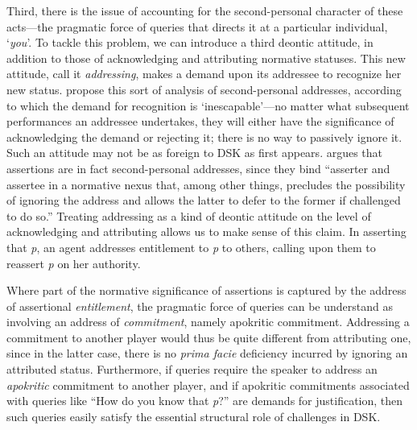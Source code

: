 \documentclass{article}                     %
\begin{document}
Third, there is the issue of accounting for the second-personal character of these acts---the pragmatic force of queries that directs it at a particular individual, `\emph{you}'. To tackle this problem, we can introduce a third deontic attitude, in addition to those of acknowledging and attributing normative statuses. This new attitude, call it \emph{addressing}, makes a demand upon its addressee to recognize her new status. \textcite{Kukla2009} propose this sort of analysis of second-personal addresses, according to which the demand for recognition is `inescapable'---no matter what subsequent performances an addressee undertakes, they will either have the significance of acknowledging the demand or rejecting it; there is no way to passively ignore it. Such an attitude may not be as foreign to DSK as first appears. \textcite{Wanderer} argues that assertions are in fact second-personal addresses, since they bind ``asserter and assertee in a normative nexus that, among other things, precludes the possibility of ignoring the address and allows the latter to defer to the former if challenged to do so.'' Treating addressing as a kind of deontic attitude on the level of acknowledging and attributing allows us to make sense of this claim. In asserting that \emph{p}, an agent addresses entitlement to \emph{p} to others, calling upon them to reassert \emph{p} on her authority.

Where part of the normative significance of assertions is captured by the address of assertional \emph{entitlement}, the pragmatic force of queries can be understand as involving an address of \emph{commitment}, namely apokritic commitment. Addressing a commitment to another player would thus be quite different from attributing one, since in the latter case, there is no \emph{prima facie} deficiency incurred by ignoring an attributed status. Furthermore, if queries require the speaker to address an \emph{apokritic} commitment to another player, and if apokritic commitments associated with queries like ``How do you know that \emph{p}?'' are demands for justification, then such queries easily satisfy the essential structural role of challenges in DSK.
\end{document}
